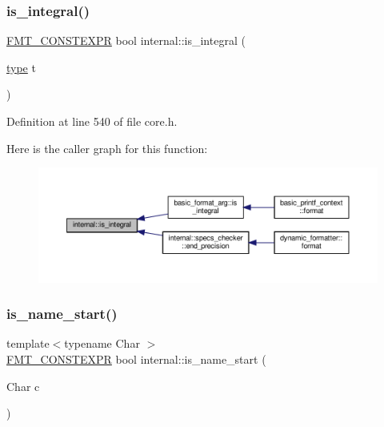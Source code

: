 \subsubsection{\texorpdfstring{is\+\_\+integral()}{is\_integral()}}
{\footnotesize\ttfamily \hyperlink{core_8h_a69201cb276383873487bf68b4ef8b4cd}{F\+M\+T\+\_\+\+C\+O\+N\+S\+T\+E\+X\+PR} bool internal\+::is\+\_\+integral (\begin{DoxyParamCaption}\item[{\hyperlink{namespaceinternal_a8661864098ac0acff9a6dd7e66f59038}{type}}]{t }\end{DoxyParamCaption})}



Definition at line 540 of file core.\+h.

Here is the caller graph for this function\+:
\nopagebreak
\begin{figure}[H]
\begin{center}
\leavevmode
\includegraphics[width=350pt]{namespaceinternal_a09faa33ade86f8ff4b7eae46cfe148ee_icgraph}
\end{center}
\end{figure}
\mbox{\label{namespaceinternal_ad6d8c955cfd596d1b78f1cc87d2cc489}} 
\subsubsection{\texorpdfstring{is\+\_\+name\+\_\+start()}{is\_name\_start()}}
{\footnotesize\ttfamily template$<$typename Char $>$ \\
\hyperlink{core_8h_a69201cb276383873487bf68b4ef8b4cd}{F\+M\+T\+\_\+\+C\+O\+N\+S\+T\+E\+X\+PR} bool internal\+::is\+\_\+name\+\_\+start (\begin{DoxyParamCaption}\item[{Char}]{c }\end{DoxyParamCaption})}



